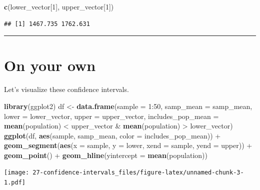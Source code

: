 \documentclass[]{book}
\newenvironment{Shaded}{\begin{snugshade}}{\end{snugshade}}
\newcommand{\KeywordTok}[1]{\textcolor[rgb]{0.13,0.29,0.53}{\textbf{{#1}}}}
\newcommand{\DataTypeTok}[1]{\textcolor[rgb]{0.13,0.29,0.53}{{#1}}}
\newcommand{\DecValTok}[1]{\textcolor[rgb]{0.00,0.00,0.81}{{#1}}}
\newcommand{\StringTok}[1]{\textcolor[rgb]{0.31,0.60,0.02}{{#1}}}
\newcommand{\NormalTok}[1]{{#1}}
\theoremstyle{definition}
\theoremstyle{definition}
\theoremstyle{remark}
\begin{document}
\begin{Shaded}
\begin{Highlighting}[]
\KeywordTok{c}\NormalTok{(lower_vector[}\DecValTok{1}\NormalTok{], upper_vector[}\DecValTok{1}\NormalTok{])}
\end{Highlighting}
\end{Shaded}

\begin{verbatim}
## [1] 1467.735 1762.631
\end{verbatim}

\begin{center}\rule{0.5\linewidth}{\linethickness}\end{center}

\section*{On your own}\label{on-your-own-3}

Let's visualize these confidence intervals.

\begin{Shaded}
\begin{Highlighting}[]
\KeywordTok{library}\NormalTok{(ggplot2)}
\NormalTok{df <-}\StringTok{ }\KeywordTok{data.frame}\NormalTok{(}\DataTypeTok{sample =} \DecValTok{1}\NormalTok{:}\DecValTok{50}\NormalTok{, }\DataTypeTok{samp_mean =} \NormalTok{samp_mean, }\DataTypeTok{lower =} \NormalTok{lower_vector, }\DataTypeTok{upper =} \NormalTok{upper_vector,}
                 \DataTypeTok{includes_pop_mean =} \KeywordTok{mean}\NormalTok{(population) <}\StringTok{ }\NormalTok{upper_vector &}\StringTok{ }\KeywordTok{mean}\NormalTok{(population) >}\StringTok{ }\NormalTok{lower_vector)}
\KeywordTok{ggplot}\NormalTok{(df, }\KeywordTok{aes}\NormalTok{(sample, samp_mean, }\DataTypeTok{color =} \NormalTok{includes_pop_mean)) +}
\StringTok{  }\KeywordTok{geom_segment}\NormalTok{(}\KeywordTok{aes}\NormalTok{(}\DataTypeTok{x =} \NormalTok{sample, }\DataTypeTok{y =} \NormalTok{lower, }\DataTypeTok{xend =} \NormalTok{sample, }\DataTypeTok{yend =} \NormalTok{upper)) +}
\StringTok{  }\KeywordTok{geom_point}\NormalTok{() +}
\StringTok{  }\KeywordTok{geom_hline}\NormalTok{(}\DataTypeTok{yintercept =} \KeywordTok{mean}\NormalTok{(population))}
\end{Highlighting}
\end{Shaded}

\texttt{[image: 27-confidence-intervals\_files/figure-latex/unnamed-chunk-3-1.pdf]}
\end{document}
